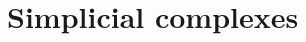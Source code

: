 \documentclass{tufte-handout}
\newtheorem{app}{Application}
\begin{document}

 
\section{Simplicial complexes}
\end{document}
